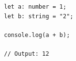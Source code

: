 \documentclass{htblagkr}
\begin{document}
    \begin{verbatim}
        let a: number = 1;
        let b: string = "2";

        console.log(a + b);

        // Output: 12
    \end{verbatim}

    \clearpage

    \listoffigures

    \clearpage

    \printabbreviations

    \clearpage

    \printglossary

    \clearpage

    \printbibliography
\end{document}
